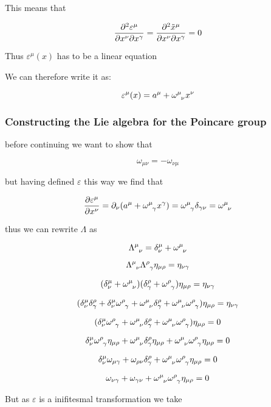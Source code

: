 This means that

$$\frac{\partial^2 \varepsilon^\mu}{\partial x^\nu \partial x^\gamma}=\frac{\partial^2 \tilde{x}^\mu}{\partial x^\nu \partial x^\gamma}=0$$

Thus $\varepsilon^\mu(x)$ has to be a linear equation

We can therefore write it as:

$$\varepsilon^{\mu}(x)=a^\mu+\omega\ein{\mu}{\nu}x^\nu$$

\subsubsection{Constructing the Lie algebra for the Poincare group}

before continuing we want to show that 

$$\omega_{\mu\nu}=-\omega_{\nu\mu}$$

but having defined $\varepsilon$ this way we find that 

$$\pder{\varepsilon^\mu}{x^\nu}=\partial_\nu(a^\mu+\omega\ein{\mu}{\gamma}x^{\gamma})=\omega\ein{\mu}{\gamma}\delta_{\gamma\nu}=\omega\ein{\mu}{\nu}$$

thus we can rewrite $\Lambda$ as

$$\Lambda\ein{\mu}{\nu}=\delta^\mu_\nu+\omega\ein{\mu}{\nu}$$

$$\Lambda\ein{\mu}{\nu}\Lambda\ein{\rho}{\gamma}\eta_{\mu\rho}=\eta_{\nu\gamma}$$

$$(\delta^\mu_\nu+\omega\ein{\mu}{\nu})(\delta^\rho_\gamma+\omega\ein{\rho}{\gamma})\eta_{\mu\rho}=\eta_{\nu\gamma}$$

$$(\delta^\mu_\nu\delta^\rho_\gamma+\delta^\mu_\nu\omega\ein{\rho}{\gamma}+\omega\ein{\mu}{\nu}\delta^\rho_\gamma+\omega\ein{\mu}{\nu}\omega\ein{\rho}{\gamma})\eta_{\mu\rho}=\eta_{\nu\gamma}$$


$$(\delta^\mu_\nu\omega\ein{\rho}{\gamma}+\omega\ein{\mu}{\nu}\delta^\rho_\gamma+\omega\ein{\mu}{\nu}\omega\ein{\rho}{\gamma})\eta_{\mu\rho}=0$$


$$\delta^\mu_\nu\omega\ein{\rho}{\gamma}\eta_{\mu\rho}
+\omega\ein{\mu}{\nu}\delta^\rho_\gamma\eta_{\mu\rho}
+\omega\ein{\mu}{\nu}\omega\ein{\rho}{\gamma}\eta_{\mu\rho}=0$$

$$\delta^\mu_\nu\omega_{\mu\gamma}+\omega_{\rho\nu}\delta^\rho_\gamma+\omega\ein{\mu}{\nu}\omega\ein{\rho}{\gamma}\eta_{\mu\rho}=0$$

$$\omega_{\nu\gamma}+\omega_{\gamma\nu}+\omega\ein{\mu}{\nu}\omega\ein{\rho}{\gamma}\eta_{\mu\rho}=0$$

But as $\varepsilon$ is a inifitesmal transformation we take

